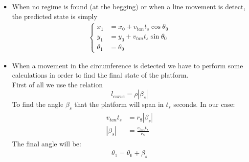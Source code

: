 \begin{itemize}
\item When no regime is found (at the begging) or when a line movement is detect, the predicted state is simply
\begin{align}
\begin{cases}
x_1 &= x_0 + v_{tan}t_s\cos{\theta_0}\\
y_1 &= y_0 + v_{tan}t_s\sin{\theta_0}\\
\theta_1 &= \theta_0
\end{cases}
\end{align}
\item When a movement in the circumference is detected we have to perform some calculations in order to find the final state of the platform.\\ 
First of all we use the relation 
$$l_{curve} = \rho|\beta_s|$$ 
To find the angle $\beta_s$ that the platform will span in $t_s$ seconds. In our case:
\begin{align}
\begin{split}
v_{tan}t_s &= r_8| \beta_{s}|\\
|\beta_{s}| &= \frac{v_{tan}t_s}{r_8}
\end{split}
 \label{eq:anglespanned}
\end{align}
The final angle will be:
 \begin{align}
 \theta_1 = \theta_0 + \beta_s
 \label{eq:anglefinal}
 \end{align}



\end{itemize}
